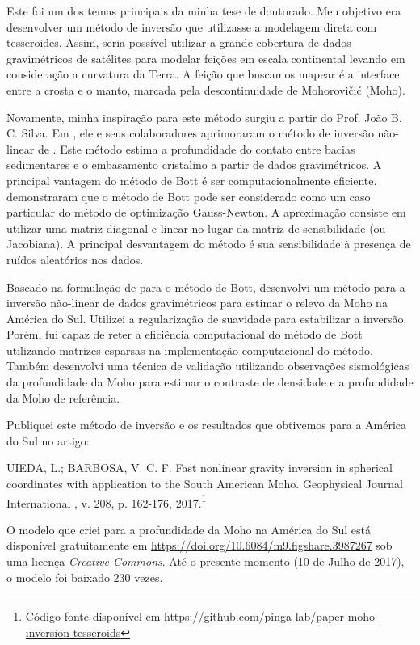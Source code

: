 \documentclass[12pt,a4paper,oneside,titlepage,onecolumn]{article}
\begin{document}
Este foi um dos temas principais da minha tese de doutorado.
Meu objetivo era desenvolver um método de inversão que utilizasse a modelagem
direta com tesseroides.
Assim, seria possível utilizar a grande cobertura de dados gravimétricos de
satélites para modelar feições em escala continental levando em
consideração a curvatura da Terra.
A feição que buscamos mapear é a interface entre a crosta e o manto, marcada
pela descontinuidade de Mohorovičić (Moho).

Novamente, minha inspiração para este método surgiu a partir do Prof. João B.
C. Silva.
Em \citet{silva2014}, ele e seus colaboradores aprimoraram o método de
inversão não-linear de \citet{bott}.
Este método estima a profundidade do contato entre bacias sedimentares e o
embasamento cristalino a partir de dados gravimétricos.
A principal vantagem do método de Bott é ser computacionalmente eficiente.
\citet{silva2014} demonstraram que o método de Bott pode ser considerado como
um caso particular do método de optimização Gauss-Newton.
A aproximação consiste em utilizar uma matriz diagonal e linear no lugar da
matriz de sensibilidade (ou Jacobiana).
A principal desvantagem do método é sua sensibilidade à presença de ruídos
aleatórios nos dados.

Baseado na formulação de \citet{silva2014} para o método de Bott, desenvolvi um
método para a inversão não-linear de dados gravimétricos para estimar o relevo
da Moho na América do Sul.
Utilizei a regularização de suavidade para estabilizar a inversão.
Porém, fui capaz de reter a eficiência computacional do método de Bott
utilizando matrizes esparsas na implementação computacional do método.
Também desenvolvi uma técnica de validação utilizando observações sismológicas
da profundidade da Moho para estimar o contraste de densidade e a profundidade
da Moho de referência.

Publiquei este método de inversão e os resultados que obtivemos para a América
do Sul no artigo:

\begin{displayquote}
    UIEDA, L.; BARBOSA, V. C. F. Fast nonlinear gravity inversion in spherical
    coordinates with application to the South American Moho. Geophysical
    Journal International , v. 208, p. 162-176, 2017.\footnote{Código fonte
    disponível em
    \url{https://github.com/pinga-lab/paper-moho-inversion-tesseroids}}
\end{displayquote}

O modelo que criei para a profundidade da Moho na América do Sul está
disponível gratuitamente em \url{https://doi.org/10.6084/m9.figshare.3987267}
sob uma licença \textit{Creative Commons}.
Até o presente momento (10 de Julho de 2017), o modelo foi
baixado 230 vezes.
\end{document}
